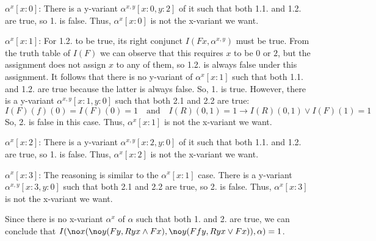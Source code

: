 \begin{enumerate}
$\alpha^x[x:0]$: There is a y-variant $\alpha^{x,y}[x:0,y:2]$ of it such that both 1.1. and 1.2. are true, so 1. is false. Thus, $\alpha^x[x:0]$ is not the x-variant we want.

$\alpha^x[x:1]$: For 1.2. to be true, its right conjunct $I(Fx, \alpha^{x,y})$ must be true. From the truth table of $I(F)$ we can observe that this requires $x$ to be $0$ or $2$, but the assignment does not assign $x$ to any of them, so 1.2. is always false under this assignment. It follows that there is no y-variant of $\alpha^x[x:1]$ such that both 1.1. and 1.2. are true because the latter is always false. So, 1. is true. However, there is a y-variant $\alpha^{x,y}[x:1,y:0]$ such that both 2.1 and 2.2 are true:
\[I(F)(f)(0) = I(F)(0) = 1 \quad\text{and}\quad I(R)(0, 1) = 1 \to I(R)(0, 1) \lor I(F)(1) = 1\] 
So, 2. is false in this case. Thus, $\alpha^x[x:1]$ is not the x-variant we want.

$\alpha^x[x:2]$: There is a y-variant $\alpha^{x,y}[x:2,y:0]$ of it such that both 1.1. and 1.2. are true, so 1. is false. Thus, $\alpha^x[x:2]$ is not the x-variant we want.

$\alpha^x[x:3]$: The reasoning is similar to the $\alpha^x[x:1]$ case. There is a y-variant $\alpha^{x,y}[x:3,y:0]$ such that both 2.1 and 2.2 are true, so 2. is false. Thus, $\alpha^x[x:3]$ is not the x-variant we want.

Since there is no x-variant $\alpha^x$ of $\alpha$ such that both 1. and 2. are true, we can conclude that $I(\no x (\no y (Fy, Ryx \land Fx), \no y (Ffy, Ryx \lor Fx)), \alpha) = 1$.

\end{enumerate}
